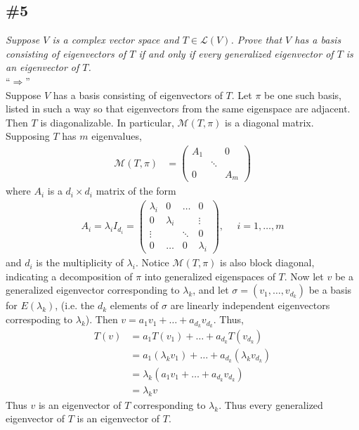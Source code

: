 \documentclass[12pt]{article}
\begin{document}
\subsection*{\#5}
{\it Suppose $V$ is a complex vector space and $T \in \mathcal{L}(V)$.  Prove that $V$ has a basis consisting of eigenvectors of $T$ if and only if every generalized eigenvector of $T$ is an eigenvector of $T$.} \\

\noindent ``$\Longrightarrow$'' \\
Suppose $V$ has a basis consisting of eigenvectors of $T$.  Let $\pi$ be one such basis, listed in such a way so that eigenvectors from the same eigenspace are adjacent.  Then $T$ is diagonalizable.  In particular, $\mathcal{M}(T, \pi)$ is a diagonal matrix.  Supposing $T$ has $m$ eigenvalues,  
\begin{align*}
	\mathcal{M}(T, \pi) &= \left(\begin{array}{ccc}
		A_1 & & 0 \\
		 & \ddots & \\
		0 & & A_m
	\end{array}\right)
\end{align*}
where $A_i$ is a $d_i \times d_i$ matrix of the form
\begin{align*}
	A_i = \lambda_iI_{d_i} = \left(\begin{array}{cccc}
		\lambda_i & 0 & \dots & 0 \\
		0 & \lambda_i & & \vdots \\
		\vdots & & \ddots & 0 \\
		0 & \dots & 0 & \lambda_i
	\end{array}\right), \ \ \ \ \ \ i = 1, \dots, m
\end{align*}
and $d_i$ is the multiplicity of $\lambda_i$.  Notice $\mathcal{M}(T, \pi)$ is also block diagonal, indicating a decomposition of $\pi$ into generalized eigenspaces of $T$.  Now let $v$ be a generalized eigenvector corresponding to $\lambda_k$, and let $\sigma = (v_1, \dots, v_{d_k})$ be a basis for $E(\lambda_k)$, (i.e. the $d_k$ elements of $\sigma$ are linearly independent eigenvectors correspoding to $\lambda_k$).  Then $v = a_1v_1 + \dots + a_{d_k}v_{d_k}$.  Thus,
\begin{align*}
T(v) &= a_1T(v_1) + \dots + a_{d_k}T(v_{d_k}) \\
&= a_1(\lambda_kv_1) + \dots + a_{d_k}(\lambda_kv_{d_k}) \\
&= \lambda_k(a_1v_1 + \dots + a_{d_k}v_{d_k}) \\
&= \lambda_kv
\end{align*}
Thus $v$ is an eigenvector of $T$ corresponding to $\lambda_k$.  Thus every generalized eigenvector of $T$ is an eigenvector of $T$. \\
\end{document}
